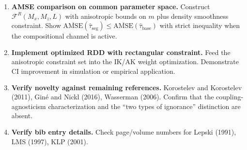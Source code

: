 \begin{enumerate}
	\item \textbf{AMSE comparison on common parameter space.}
	Construct $\mathcal{F}^R(M_x, M_z, L)$ with anisotropic bounds on $m$ plus density smoothness constraint.
	Show $\overline{\mathrm{AMSE}}(\hat\tau_{\mathrm{seg}}) \leq \overline{\mathrm{AMSE}}(\hat\tau_{\mathrm{base}})$ with strict inequality when the compositional channel is active.

	\item \textbf{Implement optimized RDD with rectangular constraint.}
	Feed the anisotropic constraint set into the IK/AK weight optimization.
	Demonstrate CI improvement in simulation or empirical application.

	\item \textbf{Verify novelty against remaining references.}
	Korostelev and Korostelev (2011), Giné and Nickl (2016), Wasserman (2006).
	Confirm that the coupling-agnosticism characterization and the ``two types of ignorance'' distinction are absent.

	\item \textbf{Verify bib entry details.}
	Check page/volume numbers for Lepski (1991), LMS (1997), KLP (2001).

\end{enumerate}
